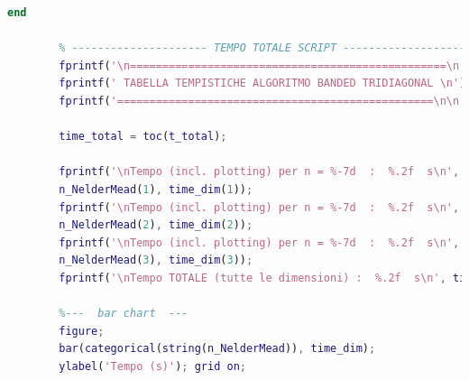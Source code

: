 \documentclass[a4paper,12pt]{article}
\begin{document}
\begin{lstlisting}[language=Matlab,caption={Full script: Nelder Mead Method on all function},label={lst:rosenbrock-extended}]
		end
		
		% --------------------- TEMPO TOTALE SCRIPT ----------------------
		fprintf('\n=================================================\n');
		fprintf(' TABELLA TEMPISTICHE ALGORITMO BANDED TRIDIAGONAL \n');
		fprintf('=================================================\n\n');
		
		time_total = toc(t_total);
		
		fprintf('\nTempo (incl. plotting) per n = %-7d  :  %.2f  s\n', ...
		n_NelderMead(1), time_dim(1));
		fprintf('\nTempo (incl. plotting) per n = %-7d  :  %.2f  s\n', ...
		n_NelderMead(2), time_dim(2));
		fprintf('\nTempo (incl. plotting) per n = %-7d  :  %.2f  s\n', ...
		n_NelderMead(3), time_dim(3));
		fprintf('\nTempo TOTALE (tutte le dimensioni) :  %.2f  s\n', time_total);
		
		%---  bar chart  ---
		figure;
		bar(categorical(string(n_NelderMead)), time_dim);
		ylabel('Tempo (s)'); grid on;
	\end{lstlisting}
	
\end{document}

